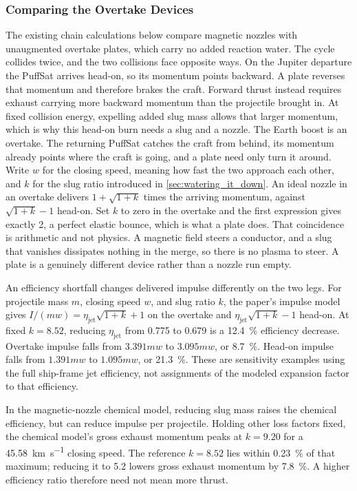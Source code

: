 \documentclass{article}
\begin{document}
\subsubsection{Comparing the Overtake Devices}\label{sec:two_leg_nozzle}
The existing chain calculations below compare magnetic nozzles with unaugmented overtake plates, which carry no added reaction water.
The cycle collides twice, and the two collisions face opposite ways. On the Jupiter departure the PuffSat arrives head-on, so its momentum points backward. A plate reverses that momentum and therefore brakes the craft. Forward thrust instead requires exhaust carrying more backward momentum than the projectile brought in. At fixed collision energy, expelling added slug mass allows that larger momentum, which is why this head-on burn needs a slug and a nozzle. The Earth boost is an overtake. The returning PuffSat catches the craft from behind, its momentum already points where the craft is going, and a plate need only turn it around. Write $w$ for the closing speed, meaning how fast the two approach each other, and $k$ for the slug ratio introduced in \autoref{sec:watering_it_down}. An ideal nozzle in an overtake delivers $1+\sqrt{1+k}$ times the arriving momentum, against $\sqrt{1+k}-1$ head-on. Set $k$ to zero in the overtake and the first expression gives exactly 2, a perfect elastic bounce, which is what a plate does. That coincidence is arithmetic and not physics. A magnetic field steers a conductor, and a slug that vanishes dissipates nothing in the merge, so there is no plasma to steer. A plate is a genuinely different device rather than a nozzle run empty.

An efficiency shortfall changes delivered impulse differently on the two legs. For projectile mass $m$, closing speed $w$, and slug ratio $k$, the paper's impulse model gives $I/(mw)=\eta_{\mathrm{jet}}\sqrt{1+k}+1$ on the overtake and $\eta_{\mathrm{jet}}\sqrt{1+k}-1$ head-on. At fixed $k=8.52$, reducing $\eta_{\mathrm{jet}}$ from 0.775 to 0.679 is a \SI{12.4}{\percent} efficiency decrease. Overtake impulse falls from $3.391mw$ to $3.095mw$, or \SI{8.7}{\percent}. Head-on impulse falls from $1.391mw$ to $1.095mw$, or \SI{21.3}{\percent}. These are sensitivity examples using the full ship-frame jet efficiency, not assignments of the modeled expansion factor to that efficiency.

In the magnetic-nozzle chemical model, reducing slug mass raises the chemical efficiency, but can reduce impulse per projectile. Holding other loss factors fixed, the chemical model's gross exhaust momentum peaks at $k=9.20$ for a \SI{45.58}{\kilo\meter\per\second} closing speed. The reference $k=8.52$ lies within \SI{0.23}{\percent} of that maximum; reducing it to 5.2 lowers gross exhaust momentum by \SI{7.8}{\percent}. A higher efficiency ratio therefore need not mean more thrust.
\end{document}

